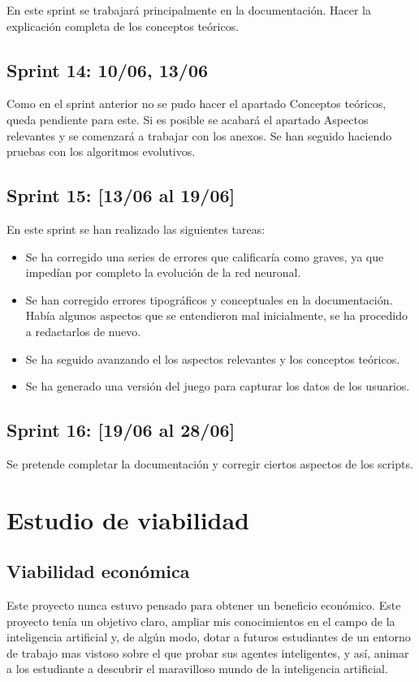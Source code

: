 En este sprint se trabajará principalmente en la documentación. Hacer la explicación completa de los conceptos teóricos.


\subsection{Sprint 14:  10/06, 13/06}

Como en el sprint anterior no se pudo hacer el apartado Conceptos teóricos, queda pendiente para este. Si es posible se acabará el apartado Aspectos relevantes y se comenzará a trabajar con los anexos. Se han seguido haciendo pruebas con los algoritmos evolutivos.

\subsection{Sprint 15: [13/06 al 19/06]}

En este sprint se han realizado las siguientes tareas: 
\begin{itemize}
    \item Se ha corregido una series de errores que calificaría como graves, ya que impedían por completo la evolución de la red neuronal.
    \item Se han corregido errores tipográficos y conceptuales en la documentación. Había algunos aspectos que se entendieron mal inicialmente, se ha procedido a redactarlos de nuevo.
    \item Se ha seguido avanzando el los aspectos relevantes y los conceptos teóricos.
    \item Se ha generado una versión del juego para capturar los datos de los usuarios.
\end{itemize}

\subsection{Sprint 16: [19/06 al 28/06]}

Se pretende completar la documentación y corregir ciertos aspectos de los scripts.

\section{Estudio de viabilidad}

\subsection{Viabilidad económica}
Este proyecto nunca estuvo pensado para obtener un beneficio económico. Este proyecto tenía un objetivo claro, ampliar mis conocimientos en el campo de la inteligencia artificial y, de algún modo, dotar a futuros estudiantes de un entorno de trabajo mas vistoso sobre el que probar sus agentes inteligentes, y así, animar a los estudiante a descubrir el maravilloso mundo de la inteligencia artificial.

